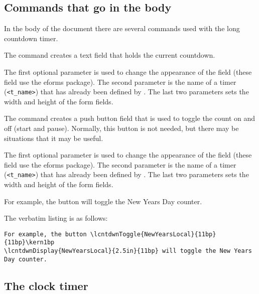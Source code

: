 \documentclass{article}
\begin{document}
\subsection{Commands that go in the body}

In the body of the document there are several commands used with the long
countdown timer.

\begin{dCmd*}{\linewidth}
\end{dCmd*}

\CmdDescription The command creates a text field that holds the current
countdown.

\PD The first optional parameter is used to change the appearance of the
field (these field use the \textsf{eforms} package). The second
parameter is the name of a timer (\texttt{<t\_name>}) that has already been
defined by . The last two parameters sets the width and
height of the form fields.

\begin{dCmd*}{\linewidth}
\end{dCmd*}

\CmdDescription The command creates a push button field that is used to
toggle the count on and off (start and pause). Normally, this button is
not needed, but there may be situations that it may be useful.

\PD The first optional parameter is used to change the appearance of the
field (these field use the \textsf{eforms} package). The second
parameter is the name of a timer (\texttt{<t\_name>}) that has already been
defined by . The last two parameters sets the width and
height of the form fields.

\newtopic For example, the button \kern1bp\kern1bp
\space\kern1bp
will toggle the New Years Day counter.

The verbatim listing is as follows:
\begin{Verbatim}[fontsize=\small]
For example, the button \lcntdwnToggle{NewYearsLocal}{11bp}{11bp}\kern1bp
\lcntdwnDisplay{NewYearsLocal}{2.5in}{11bp} will toggle the New Years
Day counter.
\end{Verbatim}

\subsection{The clock timer}
\end{document}
